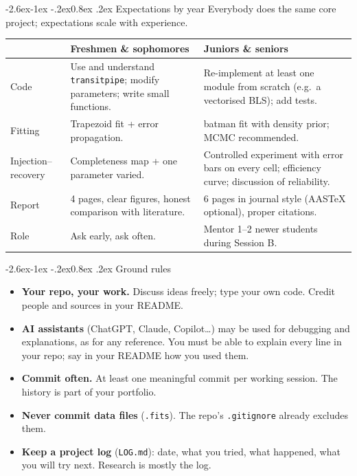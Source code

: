 \documentclass[11pt,a4paper]{article}
\makeatletter
\renewcommand\subsection{\@startsection{subsection}{2}{\z@}%
  {-2.6ex\@plus -1ex \@minus -.2ex}{0.8ex \@plus .2ex}%
  {\normalfont\sffamily\Large\bfseries\color{navy}}}
\newcommand{\pkg}[1]{\texttt{#1}}
\makeatother
\begin{document}
\subsection{Expectations by year}
Everybody does the same core project; expectations scale with experience.
\begin{center}
\small
\begin{tabularx}{\linewidth}{@{}L{2.8cm} Y Y@{}}
\toprule
 & \textbf{Freshmen \& sophomores} & \textbf{Juniors \& seniors}\\
\midrule
Code & Use and understand \pkg{transitpipe}; modify parameters; write small functions. & Re-implement at least one module from scratch (e.g.\ a vectorised BLS); add tests.\\
Fitting & Trapezoid fit + error propagation. & batman fit with density prior; MCMC recommended.\\
Injection--recovery & Completeness map + one parameter varied. & Controlled experiment with error bars on every cell; efficiency curve; discussion of reliability.\\
Report & 4 pages, clear figures, honest comparison with literature. & 6 pages in journal style (AASTeX optional), proper citations.\\
Role & Ask early, ask often. & Mentor 1--2 newer students during Session B.\\
\bottomrule
\end{tabularx}
\end{center}

\subsection{Ground rules}
\begin{itemize}
  \item \textbf{Your repo, your work.} Discuss ideas freely; type your own code. Credit people and sources in your README.
  \item \textbf{AI assistants} (ChatGPT, Claude, Copilot\ldots) may be used for debugging and explanations, as for any
        reference. You must be able to explain every line in your repo; say in your README how you used them.
  \item \textbf{Commit often.} At least one meaningful commit per working session. The history is part of your portfolio.
  \item \textbf{Never commit data files} (\texttt{.fits}). The repo's \texttt{.gitignore} already excludes them.
  \item \textbf{Keep a project log} (\texttt{LOG.md}): date, what you tried, what happened, what you will try next.
        Research is mostly the log.
\end{itemize}
\end{document}
